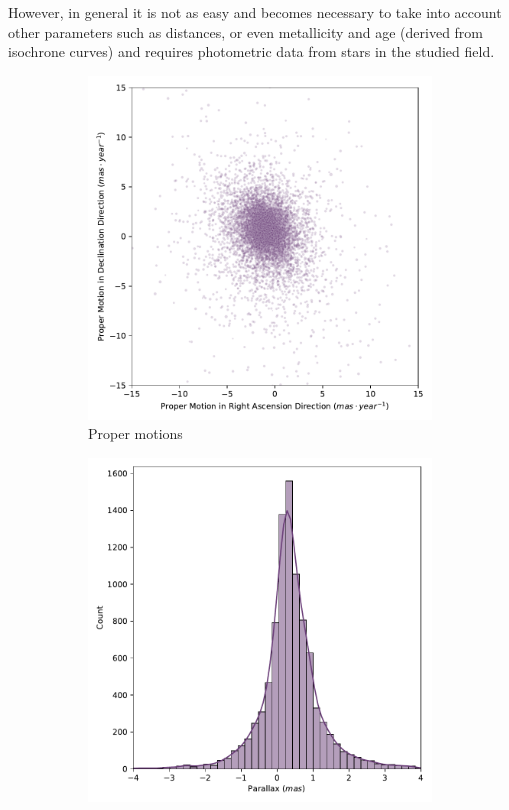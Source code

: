 \documentclass[11pt, a4paper, english]{book}
\begin{document}
However, in general it is not as easy and becomes necessary to take into account other parameters such as distances, or even
metallicity and age (derived from isochrone curves) and requires photometric data from stars in the studied field.

\begin{figure}[htbp]
  \centering
  \begin{subfigure}[t]{0.45\textwidth}
    \centering
    \includegraphics[width=\textwidth]{../figures/pm_ngc_2353.pdf}
    \caption{Proper motions}
    \label{fig:pm_ngc_2353}
  \end{subfigure}
  \hfill
  \begin{subfigure}[t]{0.45\textwidth}
    \centering
    \includegraphics[width=\textwidth]{../figures/parallax_ngc_2353.pdf}

\end{subfigure}
\end{figure}
\end{document}
